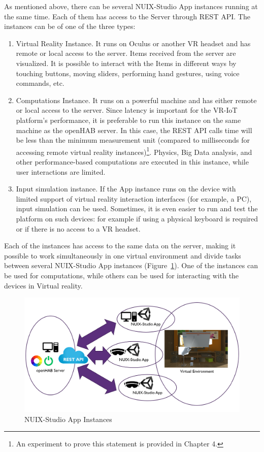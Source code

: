 As mentioned above, there can be several NUIX-Studio App instances running at the same time. Each of them has access to the Server through REST API. The instances can be of one of the three types:

\begin{enumerate}
    \item Virtual Reality Instance. It runs on Oculus or another VR headset and has remote or local access to the server. Items received from the server are visualized. It is possible to interact with the Items in different ways by touching buttons, moving sliders, performing hand gestures, using voice commands, etc. 
    \item Computations Instance. It runs on a powerful machine and has either remote or local access to the server. Since latency is important for the VR-IoT platform's performance, it is preferable to run this instance on the same machine as the openHAB server. In this case, the REST API calls time will be less than the minimum measurement unit (compared to milliseconds for accessing remote virtual reality instances)\footnote{An experiment to prove this statement is provided in Chapter 4.}. Physics, Big Data analysis, and other performance-based computations are executed in this instance, while user interactions are limited.
    \item Input simulation instance. If the App instance runs on the device with limited support of virtual reality interaction interfaces (for example, a PC), input simulation can be used. Sometimes, it is even easier to run and test the platform on such devices: for example if using a physical keyboard is required or if there is no access to a VR headset.
\end{enumerate}

Each of the instances has access to the same data on the server, making it possible to work simultaneously in one virtual environment and divide tasks between several NUIX-Studio App instances (Figure~\ref{fig:AppInstances-figure}). One of the instances can be used for computations, while others can be used for interacting with the devices in Virtual reality.

\begin{figure}
  \centering
  \includegraphics[width=0.9\linewidth]{figures/AppInstances.png}
  \caption{NUIX-Studio App Instances}
  \label{fig:AppInstances-figure}
\end{figure}

